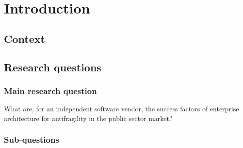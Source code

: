 \chapter{Introduction}
\label{ch:introduction}
\lipsum[1]

\section{Context}
\lipsum[1]

\section{Research questions}
\label{sec:research-questions}
\subsection{Main research question}
\label{sub:main-research-question}
What are, for an independent software vendor, the success factors of enterprise architecture for antifragility in the public sector market?
\subsection{Sub-questions}
\label{sub:sub-questions}
\lipsum[1]

